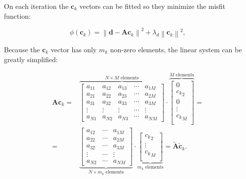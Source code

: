\documentclass[twocolumn]{article}
\begin{document}
\noindent On each iteration the $\mathbf{c}_k$ vectors can be fitted so they
minimize the misfit function:

\begin{equation}
    \phi(\mathbf{c}_k) =
        \left\lVert
            \mathbf{d} - \mathbf{A}\mathbf{c}_k
        \right\rVert ^ 2
        + \lambda_d \left\lVert \mathbf{c}_k \right\rVert ^2,
\end{equation}

Because the $\mathbf{c}_k$ vector has only $m_k$ non-zero elements, the linear
system can be greatly simplified:


\begin{equation}
    \begin{split}
        \mathbf{A}\mathbf{c}_k = &
        \overbrace{
            \begin{bmatrix}
                a_{11} & a_{12} & a_{13} & \cdots & a_{1M} \\
                a_{21} & a_{22} & a_{23} & \cdots & a_{2M} \\
                a_{31} & a_{32} & a_{33} & \cdots & a_{3M} \\
                \vdots  & \vdots  & \vdots  & \cdots & \vdots \\
                a_{N1} & a_{N2} & a_{N3} & \cdots & a_{NM}
            \end{bmatrix}
        }^\text{$N \times M$ elements}
        \cdot
        \overbrace{
            \begin{bmatrix}
                0 \\
                {c_k}_2 \\
                0 \\
                \vdots  \\
                {c_k}_M \\
            \end{bmatrix}
        }^\text{$M$ elements}
        = \\ = &
        \underbrace{
            \begin{bmatrix}
                a_{12} & \cdots & a_{1M} \\
                a_{22} & \cdots & a_{2M} \\
                a_{32} & \cdots & a_{3M} \\
                \vdots  & \cdots & \vdots \\
                a_{N2} & \cdots & a_{NM}
            \end{bmatrix}
        }_\text{$N \times m_k$ elements}
        \cdot
        \underbrace{
            \begin{bmatrix}
                {c_k}_2 \\
                \vdots  \\
                {c_k}_M \\
            \end{bmatrix}
        }_\text{$m_k$ elements}
        = \tilde{\mathbf{A}} \tilde{\mathbf{c}}_k
        .
    \end{split}
\end{equation}
\end{document}
